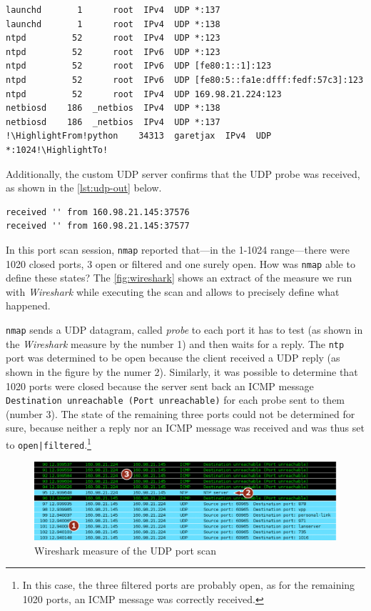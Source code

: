 \documentclass[10pt,a4paper,twoside,onecolumn]{article}
\begin{document}
\begin{lstlisting}
launchd       1      root  IPv4  UDP *:137
launchd       1      root  IPv4  UDP *:138
ntpd         52      root  IPv4  UDP *:123
ntpd         52      root  IPv6  UDP *:123
ntpd         52      root  IPv6  UDP [fe80:1::1]:123
ntpd         52      root  IPv6  UDP [fe80:5::fa1e:dfff:fedf:57c3]:123
ntpd         52      root  IPv4  UDP 169.98.21.224:123
netbiosd    186  _netbios  IPv4  UDP *:138
netbiosd    186  _netbios  IPv4  UDP *:137
!\HighlightFrom!python    34313  garetjax  IPv4  UDP *:1024!\HighlightTo!
\end{lstlisting}

Additionally, the custom UDP server confirms that the UDP probe was received, as shown in the \autoref{lst:udp-out} below.

\lstset{caption=Output of the custom UDP server during the port scan,label=lst:udp-out}
\begin{lstlisting}
received '' from 160.98.21.145:37576
received '' from 160.98.21.145:37577
\end{lstlisting}

In this port scan session, \texttt{nmap} reported that---in the 1-1024 range---there were 1020 closed ports, 3 open or filtered and one surely open. How was \texttt{nmap} able to define these states? The \autoref{fig:wireshark} shows an extract of the measure we run with \emph{Wireshark} while executing the scan and allows to precisely define what happened.

\texttt{nmap} sends a UDP datagram, called \emph{probe} to each port it has to test (as shown in the \emph{Wireshark} measure by the number 1) and then waits for a reply. The \texttt{ntp} port was determined to be open because the client received a UDP reply (as shown in the figure by the numer 2). Similarly, it was possible to determine that 1020 ports were closed because the server sent back an ICMP message \texttt{Destination unreachable (Port unreachable)} for each probe sent to them (number 3). The state of the remaining three ports could not be determined for sure, because neither a reply nor an ICMP message was received and was thus set to \texttt{open|filtered}.\footnote{In this case, the three filtered ports are probably open, as for the remaining 1020 ports, an ICMP message was correctly received.}

\begin{figure}[ht]
	\centering
	\includegraphics[width=1\textwidth]{images/wireshark}
	\caption{Wireshark measure of the UDP port scan}
	\label{fig:wireshark}
\end{figure}
\end{document}
